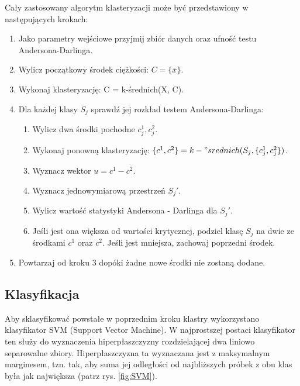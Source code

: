 Cały zastosowany algorytm klasteryzacji może być przedstawiony w następujących krokach:
\begin{enumerate}
	\item Jako parametry wejściowe przyjmij zbiór danych oraz ufność testu Andersona-Darlinga.
	\item Wylicz początkowy środek ciężkości: $C = \{\bar{x}\}$.
	\item Wykonaj klasteryzację: C = k-średnich(X, C).
	\item Dla każdej klasy $S_j$ sprawdź jej rozkład testem Andersona-Darlinga:
	\begin{enumerate}
		\item Wylicz dwa środki pochodne $c_j^1, c_j^2$.
		\item Wykonaj ponowną klasteryzację: $\{c^1, c^2\} = k-"srednich(S_j, \{c_j^1, c_j^2\})$.
		\item Wyznacz wektor $u = c^1 - c^2$.
		\item Wyznacz jednowymiarową przestrzeń $S_j '$.
		\item Wylicz wartość statystyki Andersona - Darlinga dla $S_j '$.
		\item Jeśli jest ona większa od wartości krytycznej, podziel klasę $S_j$ na dwie ze środkami $c^1$ oraz $c^2$. Jeśli jest mniejsza, zachowaj poprzedni środek.
	\end{enumerate}
	\item Powtarzaj od kroku 3 dopóki żadne nowe środki nie zostaną dodane.
\end{enumerate}

\subsection{Klasyfikacja}
\qquad Aby sklasyfikować powstałe w poprzednim kroku klastry wykorzystano klasyfikator SVM (Support Vector Machine). W najprostszej postaci klasyfikator ten służy do wyznaczenia hiperpłaszczyzny rozdzielającej dwa liniowo separowalne zbiory. Hiperpłaszczyzna ta wyznaczana jest z maksymalnym marginesem, tzn. tak, aby suma jej odległości od najbliższych próbek z obu klas była jak największa (patrz rys. \ref{fig:SVM}).

